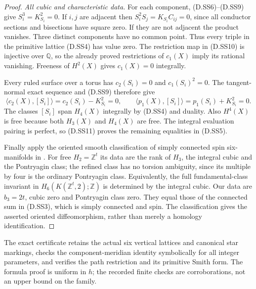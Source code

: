 \begin{proof}
\emph{All cubic and characteristic data.}
For each component, (D.SS6)--(D.SS9) give
$S_i^3=K_{S_i}^2=0$. If $i,j$ are adjacent then
$S_i^2S_j=K_{S_i}C_{ij}=0$, since all conductor sections and
bisections have square zero. If they are not adjacent the product
vanishes. Three distinct components have no common point. Thus
every triple in the primitive lattice (D.SS4) has value zero.
The restriction map in (D.SS10) is injective over $\mathbb Q$,
so the already proved restrictions of $c_1(X)$ imply its rational
vanishing. Freeness of $H^2(X)$ gives $c_1(X)=0$ integrally.

Every ruled surface over a torus has $c_2(S_i)=0$ and
$c_1(S_i)^2=0$. The tangent-normal exact sequence and (D.SS9)
therefore give
\[
 \langle c_2(X),[S_i]\rangle
   =c_2(S_i)-K_{S_i}^2=0,\qquad
 \langle p_1(X),[S_i]\rangle
   =p_1(S_i)+K_{S_i}^2=0.                                \tag{D.SS11}
\]
The classes $[S_i]$ span $H_4(X)$ integrally by (D.SS4) and duality.
Also $H^4(X)$ is free because both $H_3(X)$ and $H_4(X)$ are free.
The integral evaluation pairing is perfect, so (D.SS11) proves
the remaining equalities in (D.SS5).

Finally apply the oriented smooth classification of simply
connected spin six-manifolds in \cite[Theorem~1 and \S1.5]{manZhubr75}.
For free $H_2=\mathbb Z^t$ its data are the rank of $H_3$, the
integral cubic and the Pontryagin class; the refined class has no
torsion ambiguity, since its multiple by four is the ordinary
Pontryagin class. Equivalently, the full fundamental-class invariant
in $H_6(K(\mathbb Z^t,2);\mathbb Z)$ is determined by the integral
cubic. Our data are $b_3=2t$, cubic zero and Pontryagin class zero.
They equal those of the connected sum in (D.SS3), which is simply
connected and spin. The classification gives the asserted oriented
diffeomorphism, rather than merely a homology identification.
\end{proof}

The exact certificate  retains
the actual six vertical lattices and canonical star markings,
checks the component-meridian identity symbolically for all integer
parameters, and verifies the path restriction and its primitive
Smith form. The formula proof is uniform in $h$; the recorded finite
checks are corroborations, not an upper bound on the family.
